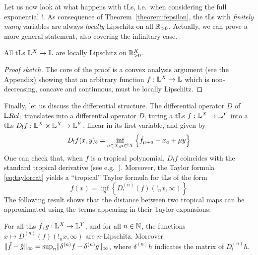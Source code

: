 Let us now look at what happens with tLs, i.e.~when considering the full exponential $!$.
As consequence of Theorem~\ref{theorem:fepsilon}, the tLs with \emph{finitely many} variables are always \emph{locally} Lipschitz on all $\mathbb{R}_{>0}$.
Actually, we can prove a more general statement, also covering the infinitary case.


\begin{theorem}\label{thmTLSlocLip}
 All tLs $\mathbb{L}^X\to\mathbb{L}$ are locally Lipschitz on $\mathbb{R}_{>0}^X$.
\end{theorem}
\begin{proof}[Proof sketch]
The core of the proof is a convex analysis argument (see the Appendix) showing that an arbitrary function $f:\mathbb{L}^X\to\mathbb{L}$ which is non-decreasing, concave and continuous, must be locally Lipschitz. 
\end{proof}


Finally, let us discuss the differential structure. The differential operator $D$ of $\LREL_{!}$ translates into a differential operator $D_{!}$ turing a tLs $f:\mathbb{L}^{X}\to \mathbb{L}^{Y}$ into a tLs $D_{!}f:\mathbb{L}^{X}\times \mathbb{L}^{X}\to \mathbb{L}^{Y}$, linear in its first variable, and given by 
\begin{equation}
D_{!}f(x,y)_{b}=\inf_{a\in X, \mu\in !X}\left\{\hat{f}_{\mu+a}+x_{a}+\mu y\right\}
\end{equation}
One can check that, when $f$ is a tropical polynomial, $D_{!}f$ coincides with the standard tropical derivative (see e.g.~\cite{Grigoriev2017}).
Moreover, the Taylor formula \eqref{eq:taylorcat} yields a ``tropical'' Taylor formula for tLs of the form 
\begin{equation}
f(x)=\inf_{n}\left\{D_{!}^{(n)}(f)(!_{n}x,\infty)\right\}
\end{equation}
The following result shows that the distance between two tropical maps can be approximated using the terms appearing in their Taylor expansions:
\begin{proposition}
For all tLs $f,g: \mathbb{L}^{X}\to \mathbb{L}^{Y}$, and for all $n\in \mathbb{N}$, 
the functions $x\mapsto D_{!}^{(n)}(f)(!_{n}x,\infty)$ are $n$-Lipschitz. Moreover 
$\lVert \hat{f}-\hat{g}\rVert_{\infty}= \sup_{n} \lVert {\delta^{(n)}f}- {\delta^{(n)}g}\rVert_{\infty}$, 
where $\delta^{(n)}h$ indicates the matrix of $D_{!}^{(n)}h$.
\end{proposition} 


